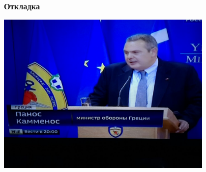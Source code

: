 \documentclass[xetex,mathserif,serif]{beamer}
\begin{document}
	\begin{frame}
		\frametitle{Откладка}
		\begin{center}
			\includegraphics[width=0.8\textwidth]{Bricks.jpg}
		\end{center}
	\end{frame}
\end{document}
